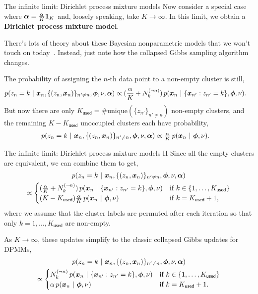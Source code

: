 \documentclass[aspectratio=169]{beamer}
\begin{document}
\begin{frame}{The infinite limit: Dirichlet process mixture models}
Now consider a special case where $\boldsymbol{\alpha} = \tfrac{\alpha}{K} \boldsymbol{1}_K$ and, loosely speaking, take $K \to \infty$. In this limit, we obtain a \textbf{Dirichlet process mixture model}. 

There's lots of theory about these Bayesian nonparametric models that we won't touch on today~\citep[see][]{orbanz2012lecture}. Instead, just note how the collapsed Gibbs sampling algorithm changes.

The probability of assigning the $n$-th data point to a non-empty cluster is still,
\begin{align}
    p(z_n=k ~\vert~ \boldsymbol{x}_n, \{(z_n, \boldsymbol{x}_n)\}_{n' \neq n}, \boldsymbol{\phi}, \nu, \boldsymbol{\alpha}) 
    &\propto (\frac{\alpha}{K} + N_k^{(\neg n)}) \, p(\boldsymbol{x}_n ~\vert~ \{\boldsymbol{x}_{n'}: z_{n'} = k\}, \boldsymbol{\phi}, \nu).
\end{align}
But now there are only $K_{\mathsf{used}} = \# \mathrm{unique}(\{z_{n'}\}_{n' \neq n})$ non-empty clusters, and the remaining $K - K_{\mathsf{used}}$ unoccupied clusters each have probability, 
\begin{align}
    p(z_n=k ~\vert~ \boldsymbol{x}_n, \{(z_n, \boldsymbol{x}_n)\}_{n' \neq n}, \boldsymbol{\phi}, \nu, \boldsymbol{\alpha}) 
    &\propto \tfrac{\alpha}{K} \, p(\boldsymbol{x}_n ~\vert~ \boldsymbol{\phi}, \nu).
\end{align}

\end{frame}

\begin{frame}{The infinite limit: Dirichlet process mixture models II}
Since all the empty clusters are equivalent, we can combine them to get,
\begin{multline}
    p(z_n=k ~\vert~ \boldsymbol{x}_n, \{(z_n, \boldsymbol{x}_n)\}_{n' \neq n}, \boldsymbol{\phi}, \nu, \boldsymbol{\alpha}) 
    \\
    \propto 
    \begin{cases}
    (\frac{\alpha}{K} + N_k^{(\neg n)}) \, p(\boldsymbol{x}_n ~\vert~ \{\boldsymbol{x}_{n'}: z_{n'} = k\}, \boldsymbol{\phi}, \nu) & \text{if } k \in \{1, \ldots, K_{\mathsf{used}} \} \\
    (K - K_{\mathsf{used}}) \tfrac{\alpha}{K} \, p(\boldsymbol{x}_n ~\vert~ \boldsymbol{\phi}, \nu) & \text{if } k = K_{\mathsf{used}} + 1,
    \end{cases}
\end{multline}
where we assume that the cluster labels are permuted after each iteration so that only $k=1, \ldots, K_{\mathsf{used}}$ are non-empty. 

As $K \to \infty$, these updates simplify to the classic collapsed Gibbs updates for DPMMs,
\begin{multline}
    p(z_n=k ~\vert~ \boldsymbol{x}_n, \{(z_n, \boldsymbol{x}_n)\}_{n' \neq n}, \boldsymbol{\phi}, \nu, \boldsymbol{\alpha}) 
    \\
    \propto 
    \begin{cases}
    N_k^{(\neg n)} \, p(\boldsymbol{x}_n ~\vert~ \{\boldsymbol{x}_{n'}: z_{n'} = k\}, \boldsymbol{\phi}, \nu) & \text{if } k \in \{1, \ldots, K_{\mathsf{used}} \} \\
    \alpha \, p(\boldsymbol{x}_n ~\vert~ \boldsymbol{\phi}, \nu) & \text{if } k = K_{\mathsf{used}} + 1.
    \end{cases}
\end{multline}
\end{frame}
\end{document}
